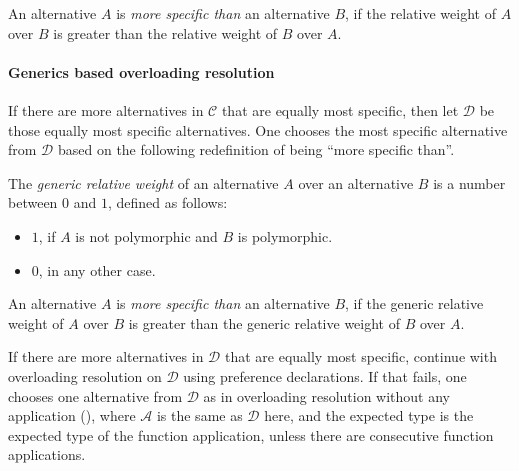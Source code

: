 An alternative $A$ is {\em more specific than} an alternative $B$, if the relative weight of $A$ over $B$ is greater than the relative weight of $B$ over $A$. 

\paragraph{Generics based overloading resolution}
If there are more alternatives in $\mathcal{C}$ that are equally most specific, then let $\mathcal{D}$ be those equally most specific alternatives. One chooses the most specific alternative from $\mathcal{D}$ based on the following redefinition of being ``more specific than''. 

\begin{definition}
The {\em generic relative weight} of an alternative $A$ over an alternative $B$ is a number between $0$ and $1$, defined as follows:
\begin{itemize}
  \item $1$, if $A$ is not polymorphic and $B$ is polymorphic. 
  \item $0$, in any other case. 
\end{itemize}
\end{definition}

An alternative $A$ is {\em more specific than} an alternative $B$, if the generic relative weight of $A$ over $B$ is greater than the generic relative weight of $B$ over $A$. 

If there are more alternatives in $\mathcal{D}$ that are equally most specific, continue with overloading resolution on $\mathcal{D}$ using preference declarations. If that fails, one chooses one alternative from $\mathcal{D}$ as in overloading resolution without any application (), where $\mathcal{A}$ is the same as $\mathcal{D}$ here, and the expected type is the expected type of the function application, unless there are consecutive function applications. 

